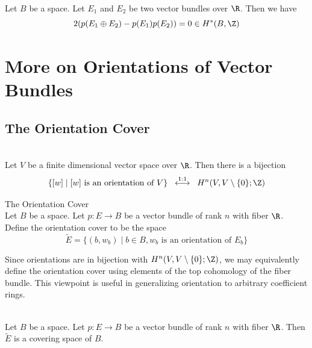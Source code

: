 \documentclass[a4paper]{article}
\begin{document}
\begin{prp}{}{}\\
Let $B$ be a space. Let $E_1$ and $E_2$ be two vector bundles over $\R$. Then we have $$2(p(E_1\oplus E_2)-p(E_1)p(E_2))=0\in H^\ast(B,\Z)$$
\end{prp}

\pagebreak
\section{More on Orientations of Vector Bundles}
\subsection{The Orientation Cover}
\begin{lmm}{}{}\\
Let $V$ be a finite dimensional vector space over $\R$. Then there is a bijection $$\{[w]\;|\;[w]\text{ is an orientation of }V\}\;\;\overset{1:1}{\longleftrightarrow}\;\;H^n(V,V\setminus\{0\};\Z)$$
\end{lmm}

\begin{defn}{The Orientation Cover}{}\\
Let $B$ be a space. Let $p:E\to B$ be a vector bundle of rank $n$ with fiber $\R$. Define the orientation cover to be the space $$\widetilde{E}=\{(b,w_b)\;|\;b\in B, w_b\text{ is an orientation of }E_b\}$$
\end{defn}

Since orientations are in bijection with $H^n(V,V\setminus\{0\};\Z)$, we may equivalently define the orientation cover using elements of the top cohomology of the fiber bundle. This viewpoint is useful in generalizing orientation to arbitrary coefficient rings. 

\begin{lmm}{}{}\\
Let $B$ be a space. Let $p:E\to B$ be a vector bundle of rank $n$ with fiber $\R$. Then $\widetilde{E}$ is a covering space of $B$. 
\end{lmm}
\end{document}
